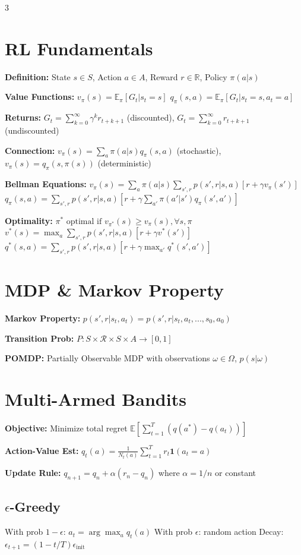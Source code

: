 \documentclass[8pt,landscape,a4paper]{article}
\begin{document}
\begin{multicols*}{3}

\section{RL Fundamentals}
\textbf{Definition:} State $s \in S$, Action $a \in A$, Reward $r \in \mathbb{R}$, Policy $\pi(a|s)$

\textbf{Value Functions:}
$v_\pi(s) = \mathbb{E}_\pi[G_t|s_t=s]$
$q_\pi(s,a) = \mathbb{E}_\pi[G_t|s_t=s,a_t=a]$

\textbf{Returns:} $G_t = \sum_{k=0}^{\infty} \gamma^k r_{t+k+1}$ (discounted), $G_t = \sum_{k=0}^{\infty} r_{t+k+1}$ (undiscounted)

\textbf{Connection:} $v_\pi(s) = \sum_a \pi(a|s)q_\pi(s,a)$ (stochastic), $v_\pi(s) = q_\pi(s,\pi(s))$ (deterministic)

\textbf{Bellman Equations:}
$v_\pi(s) = \sum_a \pi(a|s) \sum_{s',r} p(s',r|s,a)[r + \gamma v_\pi(s')]$
$q_\pi(s,a) = \sum_{s',r} p(s',r|s,a)[r + \gamma \sum_{a'} \pi(a'|s')q_\pi(s',a')]$

\textbf{Optimality:} $\pi^* \text{ optimal if } v_{\pi^*}(s) \geq v_\pi(s), \forall s, \pi$
$v^*(s) = \max_a \sum_{s',r} p(s',r|s,a)[r + \gamma v^*(s')]$
$q^*(s,a) = \sum_{s',r} p(s',r|s,a)[r + \gamma \max_{a'} q^*(s',a')]$

\section{MDP \& Markov Property}
\textbf{Markov Property:} $p(s',r|s_t,a_t) = p(s',r|s_t,a_t,...,s_0,a_0)$

\textbf{Transition Prob:} $P: S \times \mathcal{R} \times S \times A \to [0,1]$

\textbf{POMDP:} Partially Observable MDP with observations $\omega \in \Omega$, $p(s|\omega)$

\section{Multi-Armed Bandits}
\textbf{Objective:} Minimize total regret $\mathbb{E}[\sum_{t=1}^T (q(a^*) - q(a_t))]$

\textbf{Action-Value Est:} $q_t(a) = \frac{1}{N_t(a)} \sum_{t=1}^T r_t \mathbf{1}(a_t=a)$

\textbf{Update Rule:} $q_{n+1} = q_n + \alpha(r_n - q_n)$ where $\alpha = 1/n$ or constant

\subsection{$\epsilon$-Greedy}
With prob $1-\epsilon$: $a_t = \arg\max_a q_t(a)$
With prob $\epsilon$: random action
Decay: $\epsilon_{t+1} = (1-t/T)\epsilon_{\text{init}}$


\end{multicols*}
\end{document}
